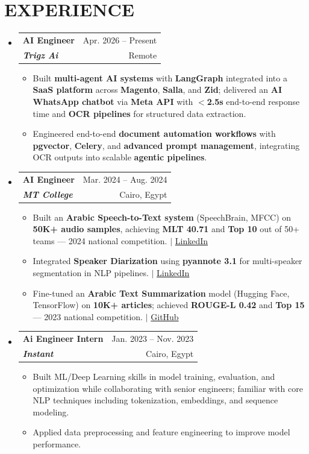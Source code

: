 \documentclass[letterpaper,11pt]{article}
\makeatletter
\newcommand{\resumeItem}[1]{
  \item\small{
    {#1 \vspace{-1pt}}
  }
}
\newcommand{\resumeSubheading}[4]{
  \vspace{-1pt}\item
    \begin{tabular*}{\textwidth}[t]{l@{\extracolsep{\fill}}r}
      \textbf{#1} & {\color{dark-grey}\small #2}\vspace{1pt}\\
      \textit{#3} & {\color{dark-grey} \small #4}\\
    \end{tabular*}\vspace{-4pt}
}
\newcommand{\resumeSubHeadingListStart}{\begin{itemize}[leftmargin=0in, label={}]}
\newcommand{\resumeSubHeadingListEnd}{\end{itemize}}
\newcommand{\resumeItemListStart}{\begin{itemize}}
\newcommand{\resumeItemListEnd}{\end{itemize}\vspace{0pt}}
\makeatother
\begin{document}
\section{EXPERIENCE}
  \resumeSubHeadingListStart

      \resumeSubheading
      {\textbf{AI Engineer}}{Apr. 2026 -- Present}
      {\textbf{Trigz Ai}}{Remote}
    \resumeItemListStart
        \resumeItem{Built \textbf{multi-agent AI systems} with \textbf{LangGraph} integrated into a \textbf{SaaS platform} across \textbf{Magento}, \textbf{Salla}, and \textbf{Zid}; delivered an \textbf{AI WhatsApp chatbot} via \textbf{Meta API} with \textbf{$<$2.5s} end-to-end response time and \textbf{OCR pipelines} for structured data extraction.}
        \resumeItem{Engineered end-to-end \textbf{document automation workflows} with \textbf{pgvector}, \textbf{Celery}, and \textbf{advanced prompt management}, integrating OCR outputs into scalable \textbf{agentic pipelines}.}
    \resumeItemListEnd
    
    \resumeSubheading
      {\textbf{AI Engineer}}{Mar. 2024 -- Aug. 2024}
      {\textbf{MT College}}{Cairo, Egypt}
      \resumeItemListStart
  \resumeItem{Built an \textbf{Arabic Speech-to-Text system} (SpeechBrain, MFCC) on \textbf{50K+ audio samples}, achieving \textbf{MLT 40.71} and \textbf{Top 10} out of 50+ teams — 2024 national competition. \textnormal{\small $|$ \href{https://www.linkedin.com/posts/ahm215_arabic-speechrecognition-speechbrain-activity-7216408459758432258-4gKf}{LinkedIn}}}
  \resumeItem{Integrated \textbf{Speaker Diarization} using \textbf{pyannote 3.1} for multi-speaker segmentation in NLP pipelines. \textnormal{\small $|$ \href{https://www.linkedin.com/posts/ahm215_ai-speechdiarization-asr-activity-7227350399966433280-Yqz0}{LinkedIn}}}
  \resumeItem{Fine-tuned an \textbf{Arabic Text Summarization} model (Hugging Face, TensorFlow) on \textbf{10K+ articles}; achieved \textbf{ROUGE-L 0.42} and \textbf{Top 15} — 2023 national competition. \textnormal{\small $|$ \href{https://github.com/AHM215/AR-Text-Summarization-Competition}{GitHub}}}
\resumeItemListEnd
      
    \resumeSubheading
      {\textbf{Ai Engineer Intern}}{Jan. 2023 -- Nov. 2023}
      {\textbf{Instant}}{Cairo, Egypt}
      \resumeItemListStart
        \resumeItem{Built ML/Deep Learning skills in model training, evaluation, and optimization while collaborating with senior engineers; familiar with core NLP techniques including tokenization, embeddings, and sequence modeling.}
        \resumeItem{Applied data preprocessing and feature engineering to improve model performance.}
\resumeItemListEnd
    \resumeSubHeadingListEnd
\end{document}
